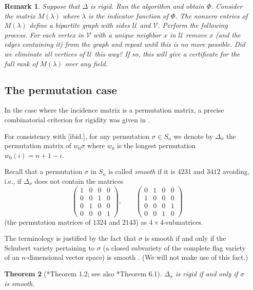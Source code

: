 \documentclass[12pt]{article}
\newtheorem{theorem}{Theorem}[section]
\newtheorem{remark}[theorem]{Remark}
\newcommand{\U}{\mathcal{U}}
\newcommand{\V}{\mathcal{V}}
\newcommand{\IM}{\Delta}
\begin{document}
\begin{remark}
Suppose that $\IM$ is rigid. Run the algorithm and obtain $\Phi$.
Consider the matrix $M(\lambda)$ where $\lambda$ is the indicator function of $\Phi$.
The nonzero entries of $M(\lambda)$ define a bipartite graph with sides $\U$ and $\V$.
Perform the following process. For each vertex in $\V$ with a unique neighbor $x$ in $\U$
remove $x$ (and the edges containing it) from the graph and repeat until this is no more possible.
Did we eliminate all vertices of $\U$ this way?
If so, this will give a certificate for the full rank of $M(\lambda)$ over any field.
\end{remark}

\subsection{The permutation case}

In the case where the incidence matrix is a permutation matrix, a precise combinatorial criterion for rigidity was given in \cite{MR3866895}.


For consistency with [ibid.], for any permutation $\sigma\in S_n$ we denote by $\IM_\sigma$ the permutation matrix of $w_0\sigma$
where $w_0$ is the longest permutation $w_0(i)=n+1-i$.

Recall that a permutation $\sigma$ in $S_n$ is called \emph{smooth} if it is $4231$ and $3412$ avoiding, i.e., if $\IM_\sigma$
does not contain the matrices
\[
\begin{pmatrix}1&0&0&0\\0&0&1&0\\0&1&0&0\\0&0&0&1\end{pmatrix},\qquad
\begin{pmatrix}0&1&0&0\\1&0&0&0\\0&0&0&1\\0&0&1&0\end{pmatrix}
\]
(the permutation matrices of $1324$ and $2143$) as $4\times 4$-submatrices.

The terminology is justified by the fact that $\sigma$ is smooth if and only if the Schubert variety pertaining to  $\sigma$
(a closed subvariety of the complete flag variety of an $n$-dimensional vector space) is smooth \cite{MR1051089}.
(We will not make use of this fact.)

\begin{theorem}[\cite{MR3866895}*{Theorem 1.2}; see also \cite{MR4847251}*{Theorem 6.1}]
$\IM_\sigma$ is rigid if and only if $\sigma$ is smooth.
\end{theorem}
\end{document}
